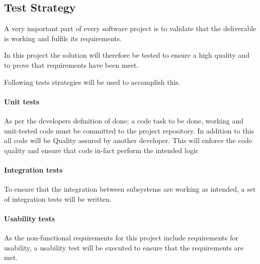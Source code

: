 \documentclass[../report.tex]{subfiles}
\begin{document}
\graphicspath{{img/}{../img/}}

\subsection{Test Strategy}

A very important part of every software project is to validate that the deliverable is working and fulfils its requirements.

In this project the solution will therefore be tested to ensure a high quality and to prove that requirements have been meet.

Following tests strategies will be used to accomplish this.

\paragraph{Unit tests}
As per the developers definition of done; a code task to be done, working and unit-tested code must be committed to the project repository. In addition to this all code will be Quality assured by another developer. This will enforce the code quality and ensure that code in-fact perform the intended logic


\paragraph{Integration tests}

To ensure that the integration between subsystems are working as intended, a set of integration tests will be written.


\paragraph{Usability tests}
As the non-functional requirements for this project include requirements for usability, a usability test will be executed to ensure that the requirements are met.
\end{document}
